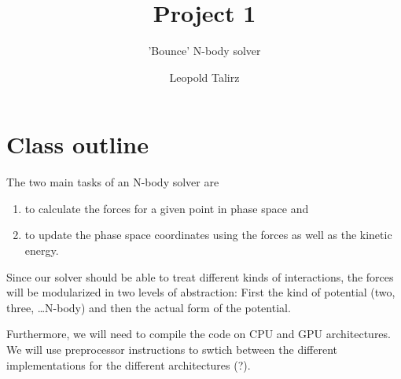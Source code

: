 \documentclass{scrartcl}
\title{Project 1}
\subtitle{'Bounce' N-body solver}
\author{Leopold Talirz}
\begin{document}
\maketitle
\tableofcontents

\chapter{Class outline}
The two main tasks of an N-body solver are
\begin{enumerate}
    \item to calculate the forces for a given point in phase space and 
    \item to update the phase space coordinates using the forces as well as
        the kinetic energy.
\end{enumerate}

Since our solver should be able to treat different kinds of interactions,
the forces will be modularized in two levels of abstraction: 
First the kind of potential (two, three, \ldots N-body) and then the
actual form of the potential.

Furthermore, we will need to compile the code on CPU and GPU architectures. 
We will use preprocessor instructions to swtich between the different
implementations for the different architectures (?).
\end{document}
